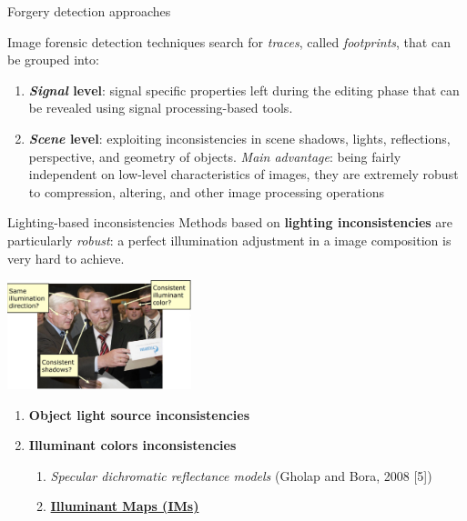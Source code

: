 \begin{tframe}{Forgery detection approaches}

\vspace{0.2cm}
Image forensic detection techniques search for \textit{traces}, called \emph{footprints}, that can be grouped into:
\vspace{0.3cm}
\begin{enumerate}
\item \textbf{\textit{Signal} level}: signal specific properties left during the editing phase that can be revealed using signal processing-based tools.
\vspace{0.3cm}
\item \textbf{\textit{Scene} level}: exploiting inconsistencies in scene shadows, lights, reflections, perspective, and geometry of objects. \textit{Main advantage}: being fairly independent on low-level characteristics of images, they are extremely robust to compression, altering, and other image processing operations
\end{enumerate}
\vspace{0.3cm}
\end{tframe}


\begin{tframe}{Lighting-based inconsistencies}
Methods based on \textbf{lighting inconsistencies} are particularly \emph{robust}: a perfect illumination adjustment in a image composition is very hard to achieve.
\begin{center}
\includegraphics[width=0.4\textwidth]{images/lighting-based.jpg}
\end{center}
\begin{enumerate}
\item \textbf{Object light source inconsistencies}
\vspace{0.1cm}
\item \textbf{Illuminant colors inconsistencies}
\vspace{0.1cm}
\begin{enumerate}
\item \textit{Specular dichromatic reflectance models} {\tiny (Gholap and Bora, 2008 [5])}
\vspace{0.1cm}
\item \textbf{\uline{Illuminant Maps (IMs)}}
\end{enumerate}
\end{enumerate}
\vspace{0.3cm}
\end{tframe}


